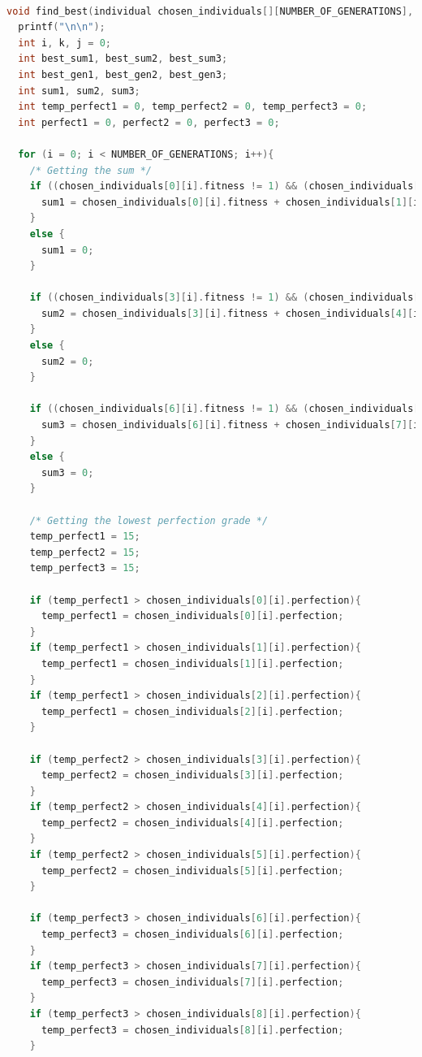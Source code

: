 \begin{lstlisting}[language=c]

void find_best(individual chosen_individuals[][NUMBER_OF_GENERATIONS], individual best_of_best[]){
  printf("\n\n");
  int i, k, j = 0;
  int best_sum1, best_sum2, best_sum3;
  int best_gen1, best_gen2, best_gen3;
  int sum1, sum2, sum3;
  int temp_perfect1 = 0, temp_perfect2 = 0, temp_perfect3 = 0;
  int perfect1 = 0, perfect2 = 0, perfect3 = 0;
  
  for (i = 0; i < NUMBER_OF_GENERATIONS; i++){
    /* Getting the sum */
    if ((chosen_individuals[0][i].fitness != 1) && (chosen_individuals[1][i].fitness != 1) && (chosen_individuals[2][i].fitness != 1)){
      sum1 = chosen_individuals[0][i].fitness + chosen_individuals[1][i].fitness + chosen_individuals[2][i].fitness;
    }
    else {
      sum1 = 0;
    }

    if ((chosen_individuals[3][i].fitness != 1) && (chosen_individuals[4][i].fitness != 1) && (chosen_individuals[5][i].fitness != 1)){
      sum2 = chosen_individuals[3][i].fitness + chosen_individuals[4][i].fitness + chosen_individuals[5][i].fitness;
    }
    else {
      sum2 = 0;
    }

    if ((chosen_individuals[6][i].fitness != 1) && (chosen_individuals[7][i].fitness != 1) && (chosen_individuals[8][i].fitness != 1)){
      sum3 = chosen_individuals[6][i].fitness + chosen_individuals[7][i].fitness + chosen_individuals[8][i].fitness;
    }
    else {
      sum3 = 0;
    }

    /* Getting the lowest perfection grade */
    temp_perfect1 = 15;
    temp_perfect2 = 15;
    temp_perfect3 = 15;

    if (temp_perfect1 > chosen_individuals[0][i].perfection){
      temp_perfect1 = chosen_individuals[0][i].perfection;
    }
    if (temp_perfect1 > chosen_individuals[1][i].perfection){
      temp_perfect1 = chosen_individuals[1][i].perfection;
    }
    if (temp_perfect1 > chosen_individuals[2][i].perfection){
      temp_perfect1 = chosen_individuals[2][i].perfection;
    }

    if (temp_perfect2 > chosen_individuals[3][i].perfection){
      temp_perfect2 = chosen_individuals[3][i].perfection;
    }
    if (temp_perfect2 > chosen_individuals[4][i].perfection){
      temp_perfect2 = chosen_individuals[4][i].perfection;
    }
    if (temp_perfect2 > chosen_individuals[5][i].perfection){
      temp_perfect2 = chosen_individuals[5][i].perfection;
    }

    if (temp_perfect3 > chosen_individuals[6][i].perfection){
      temp_perfect3 = chosen_individuals[6][i].perfection;
    }
    if (temp_perfect3 > chosen_individuals[7][i].perfection){
      temp_perfect3 = chosen_individuals[7][i].perfection;
    }
    if (temp_perfect3 > chosen_individuals[8][i].perfection){
      temp_perfect3 = chosen_individuals[8][i].perfection;
    }


\end{lstlisting}
